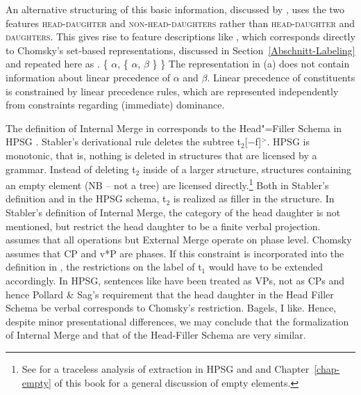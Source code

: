 \noindent
An alternative structuring of this basic information, discussed by \citet[Chapter 9]{ps2},
uses the two features \textsc{head-daughter} and \textsc{non-head-daughters} rather than
\textsc{head-daughter} and \textsc{daughters}. This gives rise to feature descriptions like , which corresponds
directly to Chomsky's set-based representations, discussed in Section~\ref{Abschnitt-Labeling} and
repeated here as .
\eal
\ex {}
\ex \{ $\alpha$, \{ $\alpha$, $\beta$ \} \}
\zl
The representation in (a) does not contain information about linear precedence of $\alpha$ and
$\beta$. Linear precedence of constituents is constrained by linear precedence rules, which are
represented independently from constraints regarding (immediate) dominance.

The definition of Internal Merge in  corresponds to the Head"=Filler Schema in HPSG
\citep[]{ps2}. Stabler's derivational rule deletes the subtree t$_2$[$-$f]$^>$. HPSG is
monotonic, that is, nothing is deleted in structures that are licensed by a grammar. Instead of deleting t$_2$ inside of a larger structure, structures
    containing an empty element (NB -- not a tree) are licensed directly.\footnote{%
  See  for a traceless analysis of extraction in HPSG and  and Chapter~\ref{chap-empty} of this book for a general discussion of empty elements.%
} Both in Stabler's definition and in the HPSG schema, t$_2$ is realized as filler in the
structure. In Stabler's definition of Internal Merge, the category of the head daughter is not
mentioned, but \citet[]{ps2} restrict the head daughter to be a finite verbal projection. \citet[]{Chomsky2007a} assumes that all operations but External Merge operate on phase level. Chomsky
assumes that CP and v*P are phases. If this constraint is incorporated into the definition in
, the restrictions on the label of t$_1$ would have to be extended
accordingly. In HPSG, sentences like  have been treated as VPs, not as CPs and hence Pollard \&
Sag's requirement that the head daughter in the Head Filler Schema be verbal corresponds to Chomsky's restriction.
\ea
Bagels, I like.
\z
Hence, despite minor presentational differences, we may conclude that the formalization of Internal
Merge and that of the Head-Filler Schema are very similar.

